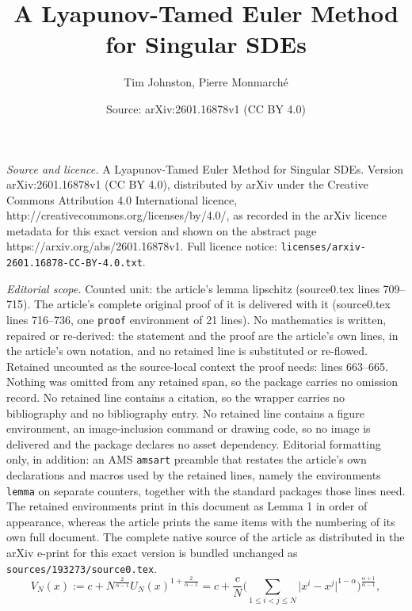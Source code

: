 \documentclass[10pt,a4paper]{amsart}
\title{A Lyapunov-Tamed Euler Method for Singular SDEs}
\author{Tim Johnston, Pierre Monmarch\'e}
\date{Source: arXiv:2601.16878v1 (CC BY 4.0)}
\begin{document}
\maketitle

\noindent\emph{Source and licence.} A Lyapunov-Tamed Euler Method for Singular SDEs. Version arXiv:2601.16878v1 (CC BY 4.0), distributed by arXiv under the Creative Commons Attribution 4.0 International licence, http://creativecommons.org/licenses/by/4.0/, as recorded in the arXiv licence metadata for this exact version and shown on the abstract page https://arxiv.org/abs/2601.16878v1. Full licence notice: \texttt{licenses/arxiv-2601.16878-CC-BY-4.0.txt}.\par\smallskip

\noindent\textit{Editorial scope.} Counted unit: the article's lemma lipschitz (source0.tex lines 709--715). The article's complete original proof of it is delivered with it (source0.tex lines 716--736, one \texttt{proof} environment of 21 lines). No mathematics is written, repaired or re-derived: the statement and the proof are the article's own lines, in the article's own notation, and no retained line is substituted or re-flowed.  Retained uncounted as the source-local context the proof needs: lines 663--665.  Nothing was omitted from any retained span, so the package carries no omission record.  No retained line contains a citation, so the wrapper carries no bibliography and no bibliography entry.  No retained line contains a figure environment, an image-inclusion command or drawing code, so no image is delivered and the package declares no asset dependency.  Editorial formatting only, in addition: an AMS \texttt{amsart} preamble that restates the article's own declarations and macros used by the retained lines, namely the environments \texttt{lemma} on separate counters, together with the standard packages those lines need.  The retained environments print in this document as Lemma 1 in order of appearance, whereas the article prints the same items with the numbering of its own full document.  The complete native source of the article as distributed in the arXiv e-print for this exact version is bundled unchanged as \texttt{sources/193273/source0.tex}.
\begin{equation}\label{eq: V_N defn}
        V_N(x):=c+N^{\frac{2}{\alpha-1}}U_N(x)^{1+\frac{2}{\alpha-1}}= c+\frac{c}{N}\biggr (\sum_{1\leq i<j\leq N} \lvert x^i-x^j\rvert^{1-\alpha} \biggr)^{\frac{\alpha+1}{\alpha-1}},
    \end{equation}
\end{document}
